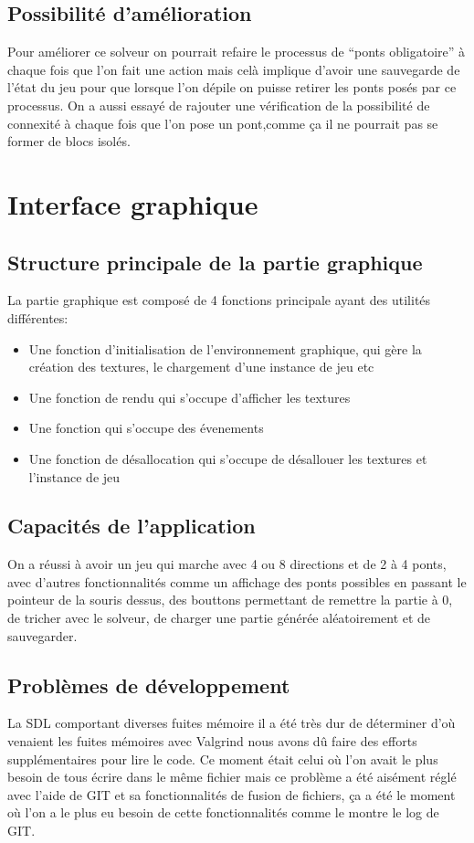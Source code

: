 \documentclass[12pt]{report}
\begin{document}
\section{Possibilité d'amélioration}
Pour améliorer ce solveur on pourrait refaire le processus de ``ponts obligatoire'' à chaque fois que l'on fait une action mais celà implique d'avoir une sauvegarde de l'état du jeu pour que lorsque l'on dépile on puisse retirer les ponts posés par ce processus. On a aussi essayé de rajouter une vérification de la possibilité de connexité à chaque fois que l'on pose un pont,comme ça il ne pourrait pas se former de blocs isolés.

\chapter{Interface graphique}
\section{Structure principale de la partie graphique}
La partie graphique est composé de 4 fonctions principale ayant des utilités différentes:
\begin{itemize}
\item Une fonction d'initialisation de l'environnement graphique, qui gère la création des textures, le chargement d'une instance de jeu etc
\item Une fonction de rendu qui s'occupe d'afficher les textures
\item Une fonction qui s'occupe des évenements
\item Une fonction de désallocation qui s'occupe de désallouer les textures et l'instance de jeu
\end{itemize}

\section{Capacités de l'application}
On a réussi à avoir un jeu qui marche avec 4 ou 8 directions et de 2 à 4 ponts, avec d'autres fonctionnalités comme un affichage des ponts possibles en passant le pointeur de la souris dessus, des bouttons permettant de remettre la partie à 0, de tricher avec le solveur, de charger une partie générée aléatoirement et de sauvegarder.

\section{Problèmes de développement}
La SDL comportant diverses fuites mémoire il a été très dur de déterminer d'où venaient les fuites mémoires avec Valgrind nous avons dû faire des efforts supplémentaires pour lire le code. Ce moment était celui où l'on avait le plus besoin de tous écrire dans le même fichier mais ce problème a été aisément réglé avec l'aide de GIT et sa fonctionnalités de fusion de fichiers, ça a été le moment où l'on a le plus eu besoin de cette fonctionnalités comme le montre le log de GIT.
\end{document}
